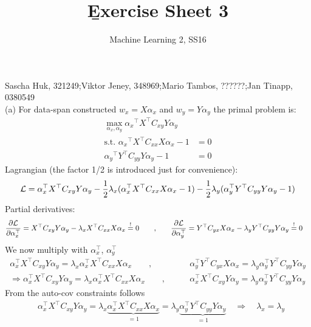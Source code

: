 \documentclass[a4paper]{article}
\DeclareMathOperator*{\argmax}{arg\,max}
\newcommand{\eqq}{  \overset{\text{!}}{=} }
\newcommand{\Yt}{{Y^\top}}
\newcommand{\Xt}{{X^\top}}
\newcommand{\lx}{{\lambda_{x}}}
\newcommand{\ly}{{\lambda_{y}}}
\newcommand{\ax}{{\alpha_{x}}}
\newcommand{\ay}{{\alpha_{y}}}
\newcommand{\axt}{\alpha_{x}^\top}
\newcommand{\ayt}{\alpha_{y}^\top}
\newcommand{\Cxx}{C_{xx}}
\newcommand{\Cxy}{C_{xy}}
\newcommand{\Cyx}{C_{yx}}
\newcommand{\Cyy}{C_{yy}}
\newcommand{\1}{\mathds{1}}
\newcommand{\lag}{\mathcal{L}}
\begin{document}
\title{\b{Exercise Sheet 3}}
\author{Machine Learning 2, SS16}

\maketitle

Sascha Huk, 321249;\quad Viktor Jeney, 348969;\quad Mario Tambos, ??????;\quad Jan Tinapp, 0380549\\


 
(a)
For data-span constructed $w_x = X\ax$ and $w_y = Y\ay$ the primal problem is:  
\begin{align*}
	\max_{\ax,\ay} \ax^\top X^\top C_{xy} Y\ay \\
	\text{s.t. } \ax^\top X^\top C_{xx} X\ax - 1 &= 0 \\
	 \ay^\top Y^\top C_{yy} Y\ay - 1 &= 0
\end{align*}
Lagrangian (the factor 1/2 is introduced just for convenience):
\begin{align*}
	\mathcal{L}=\axt\Xt\Cxy Y\ay - {1\over 2}\lx(\axt\Xt\Cxx X\ax - 1)
	- {1\over 2}\ly(\ayt\Yt\Cyy Y\ay - 1)
\end{align*}
Partial derivatives:
\begin{align*}
	{\partial\lag\over\partial\axt} = \Xt\Cxy Y\ay - \lx\Xt\Cxx X\ax \eqq 0
	\quad\quad ,&\quad\quad
	{\partial\lag\over\partial\ayt} = \Yt\Cyx X\ax - \ly\Yt\Cyy Y\ay \eqq 0
\end{align*}
We now multiply with $\axt$, $\ayt$
\begin{align*}
	\axt\Xt\Cxy Y\ay = \lx\axt\Xt\Cxx X\ax
	\quad\quad ,&\quad\quad
	\ayt\Yt\Cyx X\ax = \ly\ayt\Yt\Cyy Y\ay
	\\
	\Longrightarrow
	\axt\Xt\Cxy Y\ay = \lx\axt\Xt\Cxx X\ax
	\quad\quad ,&\quad\quad
	\axt\Xt\Cxy Y\ay = \ly\ayt\Yt\Cyy Y\ay	
\end{align*}
From the auto-cov constraints follows
\begin{align*}
	&\axt\Xt\Cxy Y\ay = \lx\underbrace{\axt\Xt\Cxx X\ax}_{=1} 
	= \ly\underbrace{\ayt\Yt\Cyy Y\ay}_{=1}
	\quad \Longrightarrow \quad \lx = \ly
\end{align*}
\end{document}
